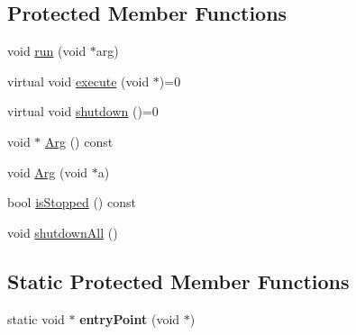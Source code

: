 \subsection*{Protected Member Functions}
\begin{DoxyCompactItemize}
\item 
void \hyperlink{classthread_1_1HAWThread_a9a3e17be59877d350e310eb19c52679b}{run} (void $\ast$arg)
\item 
virtual void \hyperlink{classthread_1_1HAWThread_ae565cb73c096b246664bd2474b9c8907}{execute} (void $\ast$)=0
\item 
virtual void \hyperlink{classthread_1_1HAWThread_a843ee9493a41cec7e932fdec67a3b244}{shutdown} ()=0
\item 
void $\ast$ \hyperlink{classthread_1_1HAWThread_ab692f3a55b92623653d8213793ba4ebb}{Arg} () const 
\item 
void \hyperlink{classthread_1_1HAWThread_a368c07a801fb8f5e7bb181d2453df4be}{Arg} (void $\ast$a)
\item 
bool \hyperlink{classthread_1_1HAWThread_a46e9f127856f36917b3a8a345b7be5ee}{is\-Stopped} () const 
\item 
void \hyperlink{classthread_1_1HAWThread_a5124385e940aa8d52510a4be10af173c}{shutdown\-All} ()
\end{DoxyCompactItemize}
\subsection*{Static Protected Member Functions}
\begin{DoxyCompactItemize}
\item 
\hypertarget{classthread_1_1HAWThread_a044da2e1a8884a3e2764f9f1863863c7}{static void $\ast$ {\bfseries entry\-Point} (void $\ast$)}\label{classthread_1_1HAWThread_a044da2e1a8884a3e2764f9f1863863c7}

\end{DoxyCompactItemize}


